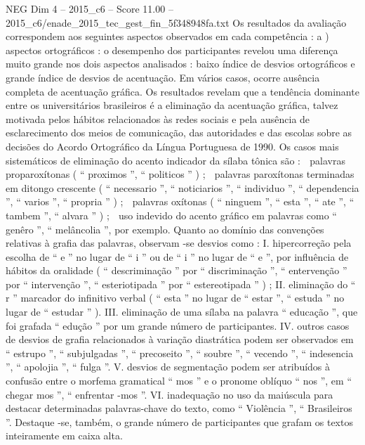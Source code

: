 \begin{textsample}{NEG Dim 4 – 2015\_c6 – Score 11.00 – 2015\_c6/enade\_2015\_tec\_gest\_fin\_5f348948fa.txt}
Os resultados da avaliação correspondem aos seguintes aspectos observados em cada competência : a ) aspectos ortográficos : o desempenho dos participantes revelou uma diferença muito grande nos dois aspectos analisados : baixo índice de desvios ortográficos e grande índice de desvios de acentuação.
Em vários casos, ocorre ausência completa de acentuação gráfica.
Os resultados revelam que a tendência dominante entre os universitários brasileiros é a eliminação da acentuação gráfica, talvez motivada pelos hábitos relacionados às redes sociais e pela ausência de esclarecimento dos meios de comunicação, das autoridades e das escolas sobre as decisões do Acordo Ortográfico da Língua Portuguesa de 1990.
Os casos mais sistemáticos de eliminação do acento indicador da sílaba tônica são :  palavras proparoxítonas ( “ proximos ”, “ politicos ” ) ;  palavras paroxítonas terminadas em ditongo crescente ( “ necessario ”, “ noticiarios ”, “ individuo ”, “ dependencia ”, “ varios ”, “ propria ” ) ;  palavras oxítonas ( “ ninguem ”, “ esta ”, “ ate ”, “ tambem ”, “ alvara ” ) ;  uso indevido do acento gráfico em palavras como “ genêro ”, “ melâncolia ”, por exemplo.
Quanto ao domínio das convenções relativas à grafia das palavras, observam -se desvios como : I. hipercorreção pela escolha de “ e ” no lugar de “ i ” ou de “ i ” no lugar de “ e ”, por influência de hábitos da oralidade ( “ descriminação ” por “ discriminação ”, “ entervenção ” por “ intervenção ”, “ esteriotipada ” por “ estereotipada ” ) ; II. eliminação do “ r ” marcador do infinitivo verbal ( “ esta ” no lugar de “ estar ”, “ estuda ” no lugar de “ estudar ” ).
III. eliminação de uma sílaba na palavra “ educação ”, que foi grafada “ edução ” por um grande número de participantes.
IV. outros casos de desvios de grafia relacionados à variação diastrática podem ser observados em “ estrupo ”, “ subjulgadas ”, “ precoseito ”, “ soubre ”, “ vecendo ”, “ indesencia ”, “ apolojia ”, “ fulga ”.
V. desvios de segmentação podem ser atribuídos à confusão entre o morfema gramatical “ mos ” e o pronome oblíquo “ nos ”, em “ chegar mos ”, “ enfrentar -mos ”.
VI. inadequação no uso da maiúscula para destacar determinadas palavras-chave do texto, como “ Violência ”, “ Brasileiros ”.
Destaque -se, também, o grande número de participantes que grafam os textos inteiramente em caixa alta.

\end{textsample}
